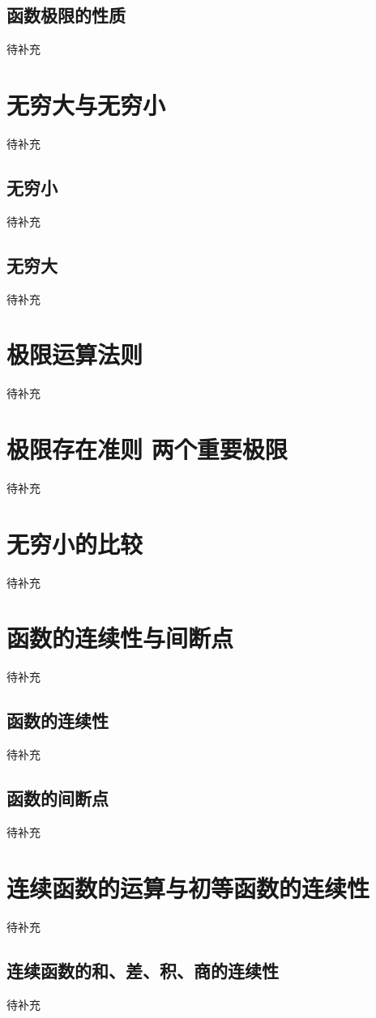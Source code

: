 \subsection{函数极限的性质}
待补充

\section{无穷大与无穷小}
待补充

\subsection{无穷小}
待补充

\subsection{无穷大}
待补充

\section{极限运算法则}
待补充

\section{极限存在准则 两个重要极限}
待补充

\section{无穷小的比较}
待补充

\section{函数的连续性与间断点}
待补充

\subsection{函数的连续性}
待补充

\subsection{函数的间断点}

待补充

\section{连续函数的运算与初等函数的连续性}
待补充
\subsection{连续函数的和、差、积、商的连续性}
待补充
